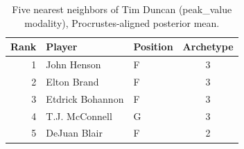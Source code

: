 \begin{table}[htbp]
  \centering\small
  \begin{tabular}{rllc}
    \toprule
    Rank & Player & Position & Archetype \\
    \midrule
    1 & John Henson & F & 3 \\
    2 & Elton Brand & F & 3 \\
    3 & Etdrick Bohannon & F & 3 \\
    4 & T.J. McConnell & G & 3 \\
    5 & DeJuan Blair & F & 2 \\
    \bottomrule
  \end{tabular}
  \caption{Five nearest neighbors of Tim Duncan (peak_value modality), Procrustes-aligned posterior mean.}
  \label{tab:Tim_Duncan_neighbors_peak_value}
\end{table}

